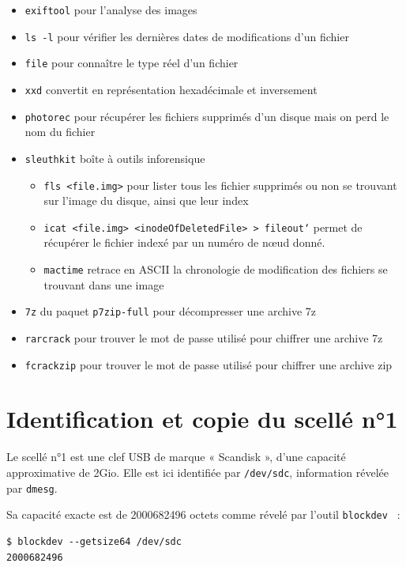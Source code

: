 \documentclass[a4paper,11pt]{article}
\begin{document}
\begin{itemize}
    \item \texttt{exiftool} pour l'analyse des images
    \item \texttt{ls -l} pour vérifier les dernières dates de modifications d'un
        fichier
    \item \texttt{file} pour connaître le type réel d'un fichier
    \item \texttt{xxd} convertit en représentation hexadécimale et inversement
    \item \texttt{photorec} pour récupérer les fichiers supprimés d'un disque
        mais on perd le nom du fichier
    \item \texttt{sleuthkit} boîte à outils inforensique
        \begin{itemize}
            \item \texttt{fls <file.img>} pour lister tous les fichier supprimés
                ou non se trouvant sur l'image du disque, ainsi que leur index
            \item \texttt{icat <file.img> <inodeOfDeletedFile> > fileout`}
                permet de récupérer le fichier indexé par un numéro de nœud
                donné.
            \item {\tt mactime} retrace en ASCII la chronologie de modification
                des fichiers se trouvant dans une image
        \end{itemize}
    \item {\tt 7z} du paquet {\tt p7zip-full} pour décompresser une archive 7z
    \item {\tt rarcrack} pour trouver le mot de passe utilisé pour chiffrer une
        archive 7z
    \item {\tt fcrackzip} pour trouver le mot de passe utilisé pour chiffrer une
        archive zip
\end{itemize}

\section{Identification et copie du scellé n°1}

Le scellé n°1 est une clef USB de marque « Scandisk », d'une capacité
approximative de 2Gio.
Elle est ici identifiée par {\tt /dev/sdc}, information révelée par {\tt dmesg}.

Sa capacité exacte est de 2000682496 octets comme révelé par l’outil
{\tt blockdev } :
\begin{verbatim}
$ blockdev --getsize64 /dev/sdc
2000682496
\end{verbatim}
\end{document}
